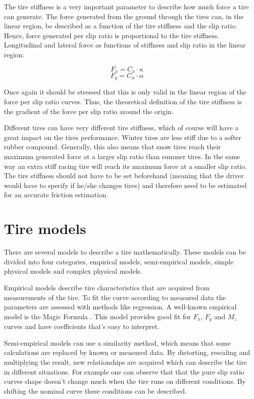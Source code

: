 The tire stiffness is a very important parameter to describe how much force a tire can generate. The  force generated from the ground through the tires can, in the linear region, be described as a function of the tire stiffness and the slip ratio. Hence, force generated per slip ratio is proportional to the tire stiffness. Longitudinal and lateral force as functions of stiffness and slip ratio in the linear region:

\begin{equation}
F_{x} = C_{x}\cdot \kappa
\end{equation}
\begin{equation}
F_{y} = C_{\alpha}\cdot \alpha
\end{equation}

Once again it should be stressed that this is only valid in the linear region of the force per slip ratio curves. Thus, the theoretical definition of the tire stiffness is the gradient of the force per slip ratio around the origin. 

Different tires can have very different tire stiffness, which of course will have a great impact on the tires performance. Winter tires are less stiff due to a softer rubber compound. Generally, this also means that snow tires reach their maximum generated force at a larger slip ratio than summer tires. In the same way an extra stiff racing tire will reach its maximum force at a smaller slip ratio. The tire stiffness should not have to be set beforehand (meaning that the driver would have to specify if he/she changes tires) and therefore need to be estimated for an accurate friction estimation.


\section{Tire models}
\label{sec:tire_models}
There are several models to describe a tire mathematically. These models can be divided into four categories, empirical models, semi-empirical models, simple physical models and complex physical  models. 

Empirical models describe tire characteristics that are acquired from measurements of the tire. To fit the curve according to measured data the parameters are assessed with methods like regression. A well-known empirical model is the Magic Formula \cite{pacejka}. This model provides good fit for $F_{x}$, $F_{y}$ and $M_{z}$ curves and have coefficients that's easy to interpret.

Semi-empirical models can use a similarity method, which means that some calculations are replaced by known or measured data. By distorting, rescaling and multiplying the result, new relationships are acquired which can describe the tire in different situations. For example one can observe that that the pure slip ratio curves shape doesn't change much \cite{pacejka} when the tire runs on different conditions. By shifting the nominal curve these conditions can be described.

